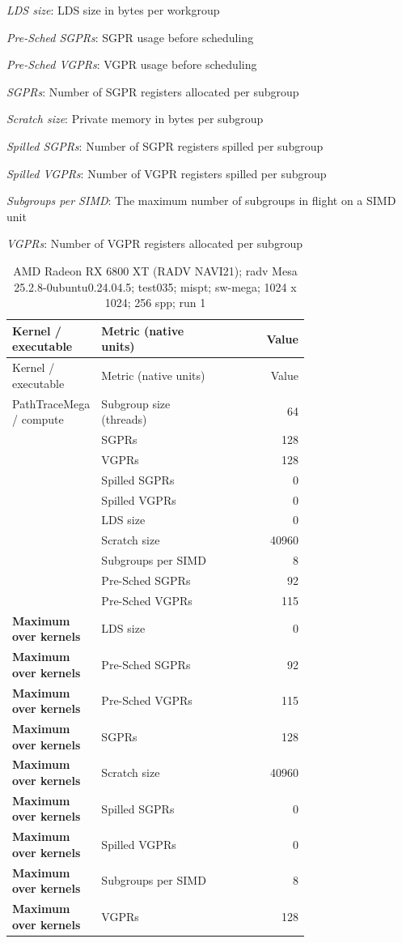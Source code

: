\noindent\textit{LDS size}: LDS size in bytes per workgroup\par
\noindent\textit{Pre-Sched SGPRs}: SGPR usage before scheduling\par
\noindent\textit{Pre-Sched VGPRs}: VGPR usage before scheduling\par
\noindent\textit{SGPRs}: Number of SGPR registers allocated per subgroup\par
\noindent\textit{Scratch size}: Private memory in bytes per subgroup\par
\noindent\textit{Spilled SGPRs}: Number of SGPR registers spilled per subgroup\par
\noindent\textit{Spilled VGPRs}: Number of VGPR registers spilled per subgroup\par
\noindent\textit{Subgroups per SIMD}: The maximum number of subgroups in flight on a SIMD unit\par
\noindent\textit{VGPRs}: Number of VGPR registers allocated per subgroup\par
\begin{longtable}{p{0.30\linewidth}p{0.43\linewidth}r}
\caption{AMD Radeon RX 6800 XT (RADV NAVI21); radv Mesa 25.2.8-0ubuntu0.24.04.5; test035; mispt; sw-mega; 1024 x 1024; 256 spp; run 1}\label{tab:hydra-profile-23}\\
\hline Kernel / executable & Metric (native units) & Value \\\hline
\endfirsthead
\hline Kernel / executable & Metric (native units) & Value \\\hline
\endhead
PathTraceMega / compute & Subgroup size (threads) & 64 \\
 & SGPRs & 128 \\
 & VGPRs & 128 \\
 & Spilled SGPRs & 0 \\
 & Spilled VGPRs & 0 \\
 & LDS size & 0 \\
 & Scratch size & 40960 \\
 & Subgroups per SIMD & 8 \\
 & Pre-Sched SGPRs & 92 \\
 & Pre-Sched VGPRs & 115 \\
\hline
\textbf{Maximum over kernels} & LDS size & 0 \\
\textbf{Maximum over kernels} & Pre-Sched SGPRs & 92 \\
\textbf{Maximum over kernels} & Pre-Sched VGPRs & 115 \\
\textbf{Maximum over kernels} & SGPRs & 128 \\
\textbf{Maximum over kernels} & Scratch size & 40960 \\
\textbf{Maximum over kernels} & Spilled SGPRs & 0 \\
\textbf{Maximum over kernels} & Spilled VGPRs & 0 \\
\textbf{Maximum over kernels} & Subgroups per SIMD & 8 \\
\textbf{Maximum over kernels} & VGPRs & 128 \\
\hline
\end{longtable}
